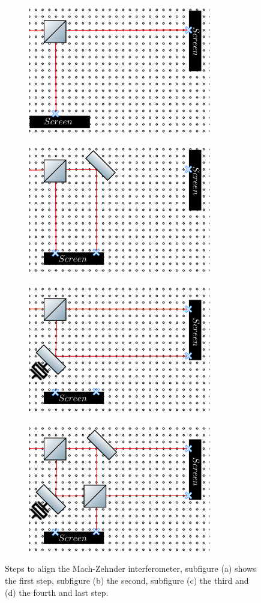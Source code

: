 \documentclass[12pt]{book}
\begin{document}
\begin{figure}[t!]
\centering
\begin{subfigure}[b]{0.55\linewidth}
\includegraphics[width=8cm,height=4 cm]{images/first_step.png}
\caption{}
\label{fig:BS1}
\end{subfigure}
\begin{subfigure}[b]{0.55\linewidth}
\includegraphics[width=8cm,height=4 cm]{images/second_step.png}
\caption{}
\label{fig:BS1}
\end{subfigure}
\begin{subfigure}[b]{0.55\linewidth}
\includegraphics[width=8cm,height=4 cm]{images/third_step.png}
\caption{}
\label{fig:BS1}
\end{subfigure}
\begin{subfigure}[b]{0.55\linewidth}
\includegraphics[width=8cm,height=4 cm]{images/last_step.png}
\caption{}
\label{fig:westminster_aerea}
\end{subfigure}
\caption{Steps to align the Mach-Zehnder interferometer, subfigure (a) shows the first step, subfigure (b) the second, subfigure (c) the third and (d) the fourth and last step.}
\label{steps}
\end{figure}
\end{document}

